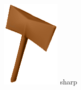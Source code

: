 \begin{frame}
\begin{columns}
\begin{column}[b]{0.22\textwidth}
\begin{center}
				\includegraphics[width=\textwidth]{./img/2_mesh/sharpAxeShaded.png}
				\small{sharp}
			\end{center}	
		\end{column}
	\end{columns}
\end{frame}	

